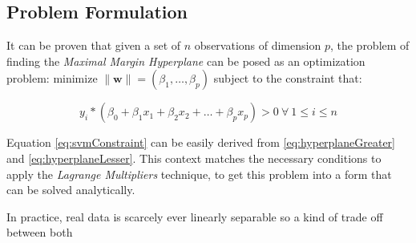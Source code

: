 \subsection{Problem Formulation}

It can be proven that given a set of $n$ observations of dimension $p$, the problem of
finding the \textit{Maximal Margin Hyperplane} can be posed as an optimization problem:
minimize $\| \mathbf{w} \| = (\beta_{1}, \dotsc, \beta_{p})$ subject to the constraint that:

\begin{equation}
  \label{eq:svmConstraint}
  y_{i} * (\beta_{0} + \beta_{1}x_{1} + \beta_{2}x_{2} + \dotsc + \beta_{p}x_{p}) > 0 \ \forall \ 1 \leq i \leq {n}
\end{equation}

Equation \ref{eq:svmConstraint} can be easily derived from \ref{eq:hyperplaneGreater} and
\ref{eq:hyperplaneLesser}. This context matches the necessary conditions to apply
the \textit{Lagrange Multipliers} technique, to get this problem into a form
that can be solved analytically.

In practice, real data is scarcely ever linearly separable so a kind of trade off between
both

